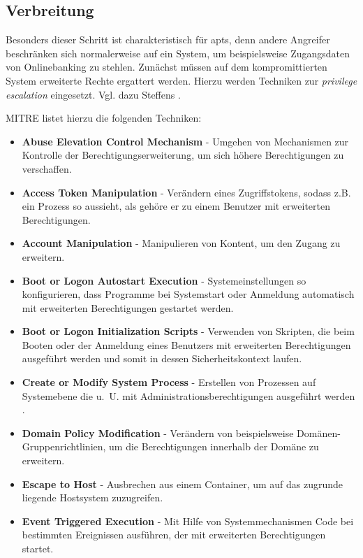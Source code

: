 \documentclass[conference]{IEEEtran}
\begin{document}
\subsection{Verbreitung}
\label{sec:proceeding:lateralmovement}

Besonders dieser Schritt ist charakteristisch für \acp{apt}, denn andere Angreifer beschränken sich normalerweise auf ein System, um beispielsweise Zugangsdaten von Onlinebanking zu stehlen.
Zunächst müssen auf dem kompromittierten System erweiterte Rechte ergattert werden.
Hierzu werden Techniken zur \textit{privilege escalation} eingesetzt.
Vgl. dazu Steffens \cite[S.~16f]{Steffens2020}.

MITRE \cite{MITREPrivilegeEscalation} listet hierzu die folgenden Techniken:
\begin{itemize}
    \item \textbf{Abuse Elevation Control Mechanism} - Umgehen von Mechanismen zur Kontrolle der Berechtigungserweiterung, um sich höhere Berechtigungen zu verschaffen.
    \item \textbf{Access Token Manipulation} - Verändern eines Zugriffstokens, sodass z.B.~ ein Prozess so aussieht, als gehöre er zu einem Benutzer mit erweiterten Berechtigungen.
    \item \textbf{Account Manipulation} - Manipulieren von Kontent, um den Zugang zu erweitern.
    \item \textbf{Boot or Logon Autostart Execution} - Systemeinstellungen so konfigurieren, dass Programme bei Systemstart oder Anmeldung automatisch mit erweiterten Berechtigungen gestartet werden.
    \item \textbf{Boot or Logon Initialization Scripts} - Verwenden von Skripten, die beim Booten oder der Anmeldung eines Benutzers mit erweiterten Berechtigungen ausgeführt werden und somit in dessen Sicherheitskontext laufen.
    \item \textbf{Create or Modify System Process} - Erstellen von Prozessen auf Systemebene die u.~U. mit Administrationsberechtigungen ausgeführt werden \cite{MITRECreateOrModifySystemProcess}.
    \item \textbf{Domain Policy Modification} - Verändern von beispielsweise Domänen-Gruppenrichtlinien, um die Berechtigungen innerhalb der Domäne zu erweitern.
    \item \textbf{Escape to Host} - Ausbrechen aus einem Container, um auf das zugrunde liegende Hostsystem zuzugreifen.
    \item \textbf{Event Triggered Execution} - Mit Hilfe von Systemmechanismen Code bei bestimmten Ereignissen ausführen, der mit erweiterten Berechtigungen startet.

\end{itemize}
\end{document}

